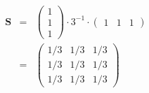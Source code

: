 \documentclass[10pt,twoside]{book}
\newcommand{\bldgr}[1]{{\mbox{\boldmath {${#1}$}}}} %
\newcommand{\fat}[1]{\mathbf{#1}} %
\newcommand{\transp}{^T} %
\begin{document}
\begin{eqnarray*}
\fat{S} 
& = & \left(
               \begin{array}{c}
                 1 \\
                 1 \\
                 1
               \end{array}
             \right)
   \cdot 3^{-1} \cdot          
  \left(
               \begin{array}{ccc}
                 1 &
                 1 &
                 1
               \end{array}
             \right)            
\\ 
& = & 
  \left(
               \begin{array}{ccc}
                 1/3 & 1/3 & 1/3 \\
                 1/3 & 1/3 & 1/3 \\
                 1/3 & 1/3 & 1/3
               \end{array}
             \right)            
\end{eqnarray*}
\end{document}
